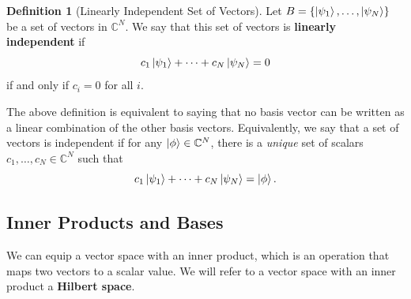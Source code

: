 \documentclass[letterpaper, 12pt]{article}
\newcommand{\C}{\mathbb{C}}	%
\newcommand{\1}{\mathds{1}}	%
\theoremstyle{definition}
\newtheorem{definition}[theorem]{Definition}
\begin{document}
\begin{definition}[Linearly Independent Set of Vectors]
    Let $B = \{\ket{\psi_1}, \ldots, \ket{\psi_N}\}$ be a set of vectors in $\C^N$. We say that this set of vectors is \textbf{linearly independent} if 
    \begin{equation}
        c_1 \ket{\psi_1} + \cdots + c_N\ket{\psi_N} = 0
    \end{equation}
    if and only if $c_i = 0$ for all $i$. 
\end{definition}

The above definition is equivalent to saying that no basis vector can be written as a linear combination of the other basis vectors. Equivalently, we say that a set of vectors is independent if for any $\ket{\phi} \in \C^N$, there is a \textit{unique} set of scalars $c_1, \ldots, c_N \in \C^N$ such that 
\begin{equation}
    c_1\ket{\psi_1} + \cdots + c_N \ket{\psi_N} = \ket{\phi}.
\end{equation}
\vspace{35mm}

\subsection{Inner Products and Bases}

We can equip a vector space with an inner product, which is an operation that maps two vectors to a scalar value. We will refer to a vector space with an inner product a \textbf{Hilbert space}. 
\end{document}
